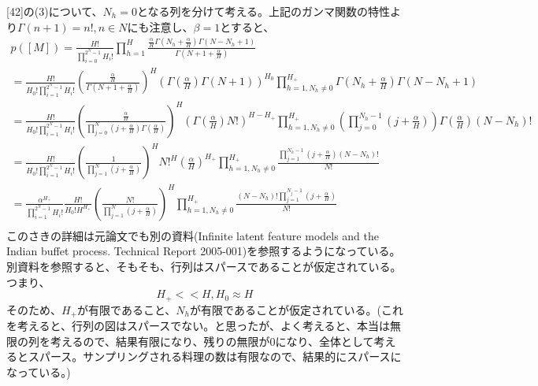 ﻿\documentclass{jsarticle}
\begin{document}
[42]の(3)について、$N_h = 0$となる列を分けて考える。上記のガンマ関数の特性より$\Gamma(n+1) = n!, n \in N$にも注意し、$\beta = 1$とすると、
\begin{equation}
\begin{split}
p([M]) = \frac{H!}{\prod_{i=0}^{2^N - 1}H_i!} \prod_{h=1}^H \frac{\frac{\alpha}{H}\Gamma(N_h + \frac{\alpha}{H})\Gamma(N - N_h + 1)}{\Gamma(N + 1 + \frac{\alpha}{H})}\\
= \frac{H!}{H_0! \prod_{i=1}^{2^N - 1}H_i!} (\frac{\frac{\alpha}{H}}{\Gamma(N + 1 + \frac{\alpha}{H})})^H (\Gamma(\frac{\alpha}{H})\Gamma(N + 1))^{H_0} \prod_{h=1, N_h \neq 0}^{H_+} \Gamma(N_h + \frac{\alpha}{H})\Gamma(N - N_h + 1)\\
= \frac{H!}{H_0! \prod_{i=1}^{2^N - 1}H_i!} (\frac{\frac{\alpha}{H}}{\prod_{j = 0}^N (j + \frac{\alpha}{H})\Gamma(\frac{\alpha}{H})})^H (\Gamma(\frac{\alpha}{H})N!)^{H - H_+} \prod_{h=1, N_h \neq 0}^{H_+} (\prod_{j=0}^{N_h - 1}(j + \frac{\alpha}{H}))\Gamma(\frac{\alpha}{H})(N - N_h)!\\
= \frac{H!}{H_0! \prod_{i=1}^{2^N - 1}H_i!} (\frac{1}{\prod_{j = 1}^N (j + \frac{\alpha}{H})})^H N!^{H} (\frac{\alpha}{H})^{H_+}\prod_{h=1, N_h \neq 0}^{H_+} \frac{\prod_{j=1}^{N_h - 1}(j + \frac{\alpha}{H})(N - N_h)!}{N!}\\
= \frac{\alpha^{H_+}}{\prod_{i=1}^{2^N - 1}H_i!} \frac{H!}{H_0!H^{H_+}}(\frac{N!}{\prod_{j = 1}^N (j + \frac{\alpha}{H})})^H \prod_{h=1, N_h \neq 0}^{H_+} \frac{(N - N_h)!\prod_{j=1}^{N_j - 1}(j + \frac{\alpha}{H})}{N!}\\
\end{split}
\end{equation}
このさきの詳細は元論文でも別の資料(Infinite latent feature models and the Indian buffet process. Technical Report 2005-001)を参照するようになっている。別資料を参照すると、そもそも、行列はスパースであることが仮定されている。
つまり、
\begin{equation}
H_+ << H, H_0 \approx H
\end{equation}
そのため、$H_+$が有限であること、$N_h$が有限であることが仮定されている。(これを考えると、行列の図はスパースでない。と思ったが、よく考えると、本当は無限の列を考えるので、結果有限になり、残りの無限が0になり、全体として考えるとスパース。サンプリングされる料理の数は有限なので、結果的にスパースになっている。)
\end{document}
